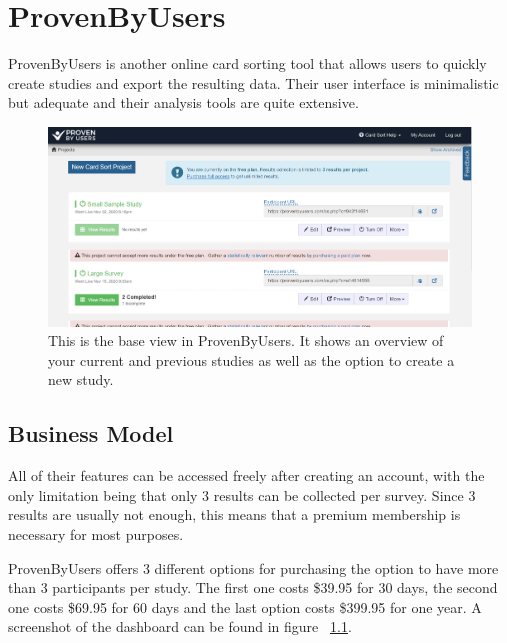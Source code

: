 \chapter{ProvenByUsers}

\label{chap:ProvenByUsers}


ProvenByUsers is another online card sorting tool that allows users to quickly 
create studies and export the resulting data. Their user interface is 
minimalistic but adequate and their analysis tools are quite extensive.

\begin{figure}[tp] 
\centering
\includegraphics[keepaspectratio,width=\linewidth,height=\halfh]{images/provenbyusers-dashboard.png}
\caption[ProvenByUsers Application] { This is the base view in ProvenByUsers.
It shows an overview of your current and previous studies as well as the option
to create a new study.
 }
\label{fig:ProvenByUsers1}
\end{figure}


\section{Business Model}
All of their features can be accessed freely after creating an account, with the
only limitation being that only 3 results can be collected per survey. Since 3 
results are usually not enough, this means that a premium membership is necessary
for most purposes.

ProvenByUsers offers 3 different options for purchasing the option to have 
more than 3 participants per study. The first one costs \$39.95 for 30 days, 
the second one costs \$69.95 for 60 days and the last option costs \$399.95 
for one year. A screenshot of the dashboard can be found in figure 
~\ref{fig:ProvenByUsers1}.

